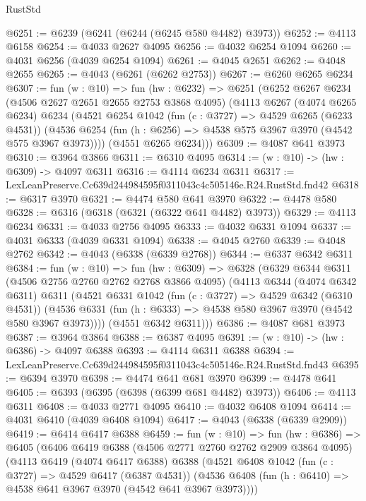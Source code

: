 \begin{lexlean}{RustStd}
\begin{coremodule}
@6251 := @6239 (@6241 (@6244 (@6245 @580 @4482) @3973))
@6252 := @4113 @6158
@6254 := @4033 @2627 @4095
@6256 := @4032 @6254 @1094
@6260 := @4031 @6256 (@4039 @6254 @1094)
@6261 := @4045 @2651
@6262 := @4048 @2655
@6265 := @4043 (@6261 (@6262 @2753))
@6267 := @6260 @6265 @6234
@6307 := fun (w : @10) =>
  fun (hw : @6232) =>
  @6251
    (@6252
      @6267
      @6234
      (@4506 @2627 @2651 @2655 @2753 @3868 @4095)
      (@4113
        @6267
        (@4074 @6265 @6234)
        @6234
        (@4521
          @6254
          @1042
          (fun (c : @3727) => @4529 @6265 (@6233 @4531))
          (@4536 @6254 (fun (h : @6256) => @4538 @575 @3967 @3970 (@4542 @575 @3967 @3973))))
        (@4551 @6265 @6234)))
@6309 := @4087 @641 @3973
@6310 := @3964 @3866
@6311 := @6310 @4095
@6314 := (w : @10) -> (hw : @6309) -> @4097 @6311
@6316 := @4114 @6234 @6311
@6317 := LexLeanPreserve.Cc639d244984595f0311043c4c505146e.R24.RustStd.fnd42
@6318 := @6317 @3970
@6321 := @4474 @580 @641 @3970
@6322 := @4478 @580
@6328 := @6316 (@6318 (@6321 (@6322 @641 @4482) @3973))
@6329 := @4113 @6234
@6331 := @4033 @2756 @4095
@6333 := @4032 @6331 @1094
@6337 := @4031 @6333 (@4039 @6331 @1094)
@6338 := @4045 @2760
@6339 := @4048 @2762
@6342 := @4043 (@6338 (@6339 @2768))
@6344 := @6337 @6342 @6311
@6384 := fun (w : @10) =>
  fun (hw : @6309) =>
  @6328
    (@6329
      @6344
      @6311
      (@4506 @2756 @2760 @2762 @2768 @3866 @4095)
      (@4113
        @6344
        (@4074 @6342 @6311)
        @6311
        (@4521
          @6331
          @1042
          (fun (c : @3727) => @4529 @6342 (@6310 @4531))
          (@4536 @6331 (fun (h : @6333) => @4538 @580 @3967 @3970 (@4542 @580 @3967 @3973))))
        (@4551 @6342 @6311)))
@6386 := @4087 @681 @3973
@6387 := @3964 @3864
@6388 := @6387 @4095
@6391 := (w : @10) -> (hw : @6386) -> @4097 @6388
@6393 := @4114 @6311 @6388
@6394 := LexLeanPreserve.Cc639d244984595f0311043c4c505146e.R24.RustStd.fnd43
@6395 := @6394 @3970
@6398 := @4474 @641 @681 @3970
@6399 := @4478 @641
@6405 := @6393 (@6395 (@6398 (@6399 @681 @4482) @3973))
@6406 := @4113 @6311
@6408 := @4033 @2771 @4095
@6410 := @4032 @6408 @1094
@6414 := @4031 @6410 (@4039 @6408 @1094)
@6417 := @4043 (@6338 (@6339 @2909))
@6419 := @6414 @6417 @6388
@6459 := fun (w : @10) =>
  fun (hw : @6386) =>
  @6405
    (@6406
      @6419
      @6388
      (@4506 @2771 @2760 @2762 @2909 @3864 @4095)
      (@4113
        @6419
        (@4074 @6417 @6388)
        @6388
        (@4521
          @6408
          @1042
          (fun (c : @3727) => @4529 @6417 (@6387 @4531))
          (@4536 @6408 (fun (h : @6410) => @4538 @641 @3967 @3970 (@4542 @641 @3967 @3973))))

\end{coremodule}
\end{lexlean}

